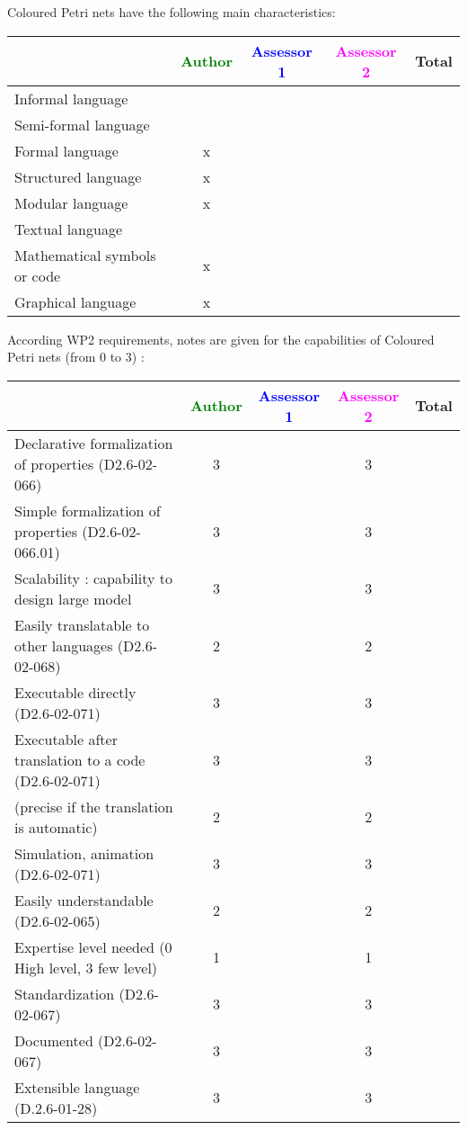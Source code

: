 Coloured Petri nets have the following main characteristics:

\begin{tabular}{|l | c | c | c | c|}
\hline
& \textcolor{green}{Author} & \textcolor{blue}{Assessor 1} & \textcolor{magenta}{Assessor 2} & Total \\
\hline 
Informal language & & & &  \\
\hline 
Semi-formal language & & & &  \\
\hline
Formal language & x & & &  \\
\hline
Structured language & x & & & \\
\hline
Modular language & x & & & \\
\hline
Textual language & & & & \\
\hline
Mathematical symbols or code & x & & & \\
\hline
Graphical language & x & & & \\
\hline
\end{tabular}

According WP2 requirements, notes are given for the capabilities of Coloured Petri nets (from 0 to 3) :

\begin{tabular}{|l | c | c | c | c|}
\hline
& \textcolor{green}{Author} & \textcolor{blue}{Assessor 1} & \textcolor{magenta}{Assessor 2} & Total \\
\hline
Declarative formalization of properties (D2.6-02-066) & 3 & & 3 & \\
\hline
Simple formalization of properties (D2.6-02-066.01) & 3 & & 3 & \\
\hline
Scalability : capability to design large model & 3 & & 3 & \\
\hline
Easily translatable to other languages (D2.6-02-068) & 2 & & 2 & \\
\hline
Executable directly (D2.6-02-071) & 3 & & 3 & \\
\hline
Executable after translation to a code (D2.6-02-071) & 3 & & 3 & \\
(precise if the translation is automatic) & 2 & & 2 & \\
\hline
Simulation, animation (D2.6-02-071) & 3 & & 3 & \\
\hline
Easily understandable (D2.6-02-065) & 2 & & 2 & \\
\hline
Expertise level needed (0 High level, 3 few level) & 1 & & 1 & \\
\hline
Standardization (D2.6-02-067) & 3 & & 3 & \\
\hline
Documented (D2.6-02-067) & 3 & & 3 & \\
\hline
Extensible language (D.2.6-01-28) & 3 & & 3 & \\
\hline
\end{tabular}


